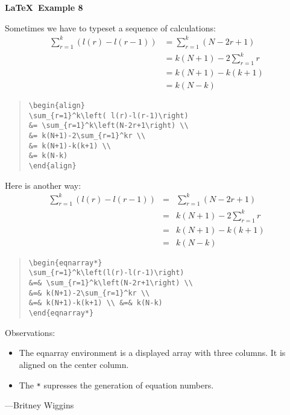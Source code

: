 \documentclass[12pt]{article}
\begin{document}
\begin{center}
{\large\bfseries\LaTeX\ Example 8}
\end{center}
Sometimes we have to typeset a sequence of calculations:
\begin{align}
\sum_{r=1}^k\left( l(r)-l(r-1)\right) 
&= \sum_{r=1}^k\left(N-2r+1\right) \\ 
&= k(N+1)-2\sum_{r=1}^kr \\ 
&= k(N+1)-k(k+1) \\ 
&= k(N-k) 
\end{align}
\begin{quote}
\begin{verbatim}
\begin{align}
\sum_{r=1}^k\left( l(r)-l(r-1)\right) 
&= \sum_{r=1}^k\left(N-2r+1\right) \\ 
&= k(N+1)-2\sum_{r=1}^kr \\ 
&= k(N+1)-k(k+1) \\ 
&= k(N-k) 
\end{align}
\end{verbatim}
\end{quote}
Here is another way:
\begin{eqnarray*} 
\sum_{r=1}^k\left(l(r)-l(r-1)\right) 
&=& \sum_{r=1}^k\left(N-2r+1\right) \\ 
&=& k(N+1)-2\sum_{r=1}^kr \\ 
&=& k(N+1)-k(k+1) \\ &=& k(N-k) 
\end{eqnarray*}
\begin{quote}
\begin{verbatim}
\begin{eqnarray*} 
\sum_{r=1}^k\left(l(r)-l(r-1)\right) 
&=& \sum_{r=1}^k\left(N-2r+1\right) \\ 
&=& k(N+1)-2\sum_{r=1}^kr \\ 
&=& k(N+1)-k(k+1) \\ &=& k(N-k) 
\end{eqnarray*}
\end{verbatim}
\end{quote}
Observations:
\begin{itemize}
\item The eqnarray environment is a displayed array with three columns.  It is aligned on
the center column.
\item The \verb+*+ supresses the generation of equation numbers.
\end {itemize}
---Britney Wiggins
\end{document}

